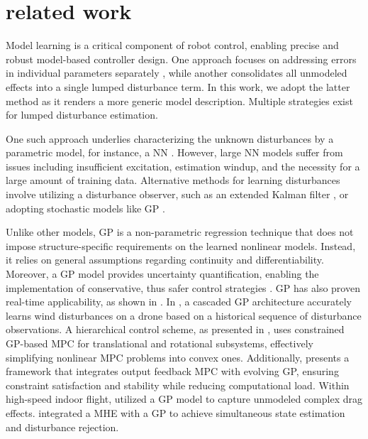 \section{related work}
\label{sec:related_work}

Model learning is a critical component of robot control, enabling precise and robust model-based controller design. One approach focuses on addressing errors in individual parameters separately \cite{aero, madebo2024robust, tiltrotor}, while another consolidates all unmodeled effects into a single lumped disturbance term.
In this work, we adopt the latter method as it renders a more generic model description. Multiple strategies exist for lumped disturbance estimation. 

One such approach underlies characterizing the unknown disturbances by a parametric model, for instance, a \ac{NN} \cite{salzmann2023real, neural-fly}. However, large \ac{NN} models suffer from issues including insufficient excitation, estimation windup, and the necessity for a large amount of training data. Alternative methods for learning disturbances involve utilizing a disturbance observer, such as an extended Kalman filter \cite{rov_ekf2}, or adopting stochastic models like \ac{GP} \cite{bionic_gp}.

Unlike other models, \ac{GP} is a non-parametric regression technique that does not impose structure-specific requirements on the learned nonlinear models. Instead, it relies on general assumptions regarding continuity and differentiability. Moreover, a \ac{GP} model provides uncertainty quantification, enabling the implementation of conservative, thus safer control strategies \cite{cautious_mpc, prajapat2024safe}. \ac{GP} has also proven real-time applicability, as shown in \cite{real-gp-mpc, wono1}. In \cite{mohit_gp}, a cascaded GP architecture accurately learns wind disturbances on a drone based on a historical sequence of disturbance observations. A hierarchical control scheme, as presented in \cite{cao2017gaussian}, uses constrained \ac{GP}-based \ac{MPC} for translational and rotational subsystems, effectively simplifying nonlinear \ac{MPC} problems into convex ones. Additionally, \cite{maiworm2021online} presents a framework that integrates output feedback \ac{MPC} with evolving \ac{GP}, ensuring constraint satisfaction and stability while reducing computational load. Within high-speed indoor flight, \cite{data_driven_mpc} utilized a \ac{GP} model to capture unmodeled complex drag effects. \cite{wono2}  integrated a \ac{MHE} with a \ac{GP} to achieve simultaneous state estimation and disturbance rejection. 

